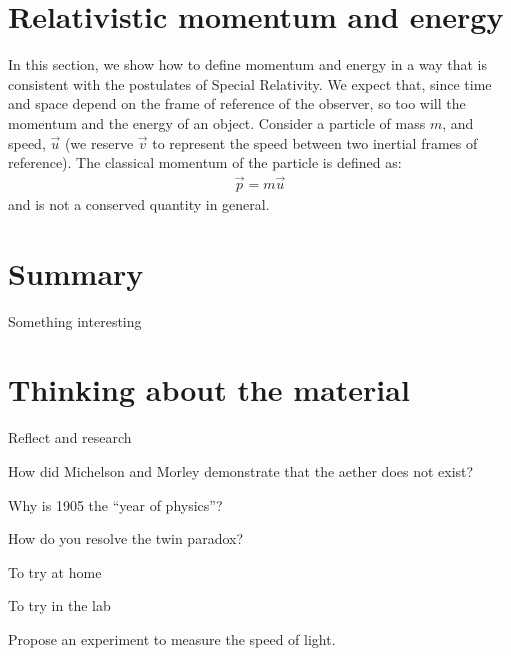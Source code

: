 \section{Relativistic momentum and energy}
In this section, we show how to define momentum and energy in a way that is consistent with the postulates of Special Relativity. We expect that, since time and space depend on the frame of reference of the observer, so too will the momentum and the energy of an object. Consider a particle of mass $m$, and speed, $\vec u$ (we reserve $\vec v$ to represent the speed between two inertial frames of reference). The classical momentum of the particle is defined as:
\begin{align*}
\vec p = m\vec u
\end{align*}
and is not a conserved quantity in general.




\newpage
\section{Summary}
\vspace{2cm}
\begin{chapterSummary}
\item Something interesting
\end{chapterSummary}


\newpage
\section{Thinking about the material}

\begin{chapteractivity}{Reflect and research}
	{
	\item How did Michelson and Morley demonstrate that the aether does not exist? 
	\item Why is 1905 the ``year of physics''?
	\item How do you resolve the twin paradox?
	}
\end{chapteractivity}

\begin{chapteractivity}{To try at home}
	{
		\item 
	}
\end{chapteractivity}

\begin{chapteractivity}{To try in the lab}
	{
		\item Propose an experiment to measure the speed of light.
	}
\end{chapteractivity}

